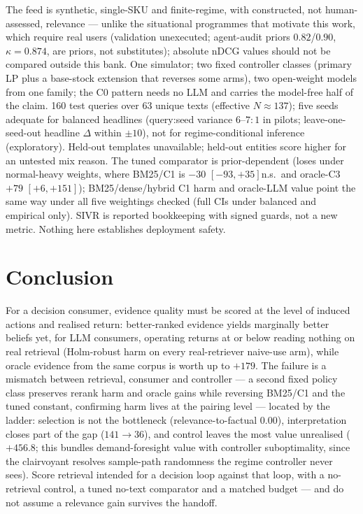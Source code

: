 \documentclass[runningheads]{llncs}
\begin{document}
The feed is synthetic, single-SKU and finite-regime, with constructed, not
human-assessed, relevance --- unlike the situational programmes that motivate
this work, which require real users (validation unexecuted; agent-audit
priors $0.82$/$0.90$, $\kappa=0.874$, are priors, not substitutes); absolute
nDCG values should
not be compared outside this bank. One simulator; two fixed controller
classes (primary LP plus a base-stock extension that reverses some arms),
two open-weight models from one family; the C0 pattern needs no LLM and
carries the model-free half of the claim. 160 test queries over 63 unique
texts
(effective $N\approx137$); five seeds adequate for balanced headlines
(query:seed variance $6$--$7{:}1$ in pilots; leave-one-seed-out headline
$\Delta$ within $\pm10$), not
for regime-conditional inference (exploratory). Held-out templates
unavailable; held-out entities score higher for
an untested mix reason. The tuned comparator is prior-dependent (loses under
normal-heavy weights, where BM25/C1 is $-30$ $[-93,+35]$n.s.\ and oracle-C3
$+79$ $[+6,+151]$); BM25/dense/hybrid C1 harm and oracle-LLM value point
the same way under all five weightings checked (full CIs under balanced and
empirical only). SIVR is
reported bookkeeping with signed guards, not a new metric. Nothing here
establishes deployment safety.

\section{Conclusion}
\label{sec:conclusion}

For a decision consumer, evidence quality must be scored at the level of
induced actions and realised return: better-ranked evidence yields marginally
better beliefs yet, for LLM consumers, operating returns at or below reading
nothing on real retrieval (Holm-robust harm on every real-retriever naive-use
arm), while oracle evidence from
the same corpus is worth up to $+179$. The failure is a mismatch between
retrieval, consumer and controller --- a second fixed policy class preserves
rerank harm and oracle gains while reversing BM25/C1 and the tuned constant,
confirming harm lives at the pairing level --- located by the ladder:
selection is not the bottleneck (relevance-to-factual $0.00$),
interpretation closes part of the gap ($141 \to 36$), and control leaves the
most value unrealised ($+456.8$; this bundles demand-foresight value with
controller suboptimality, since the clairvoyant resolves sample-path
randomness the regime controller never sees). Score retrieval intended for a decision loop
against that loop, with a no-retrieval control, a tuned no-text comparator
and a matched budget --- and do not assume a relevance gain survives the
handoff.
\end{document}
